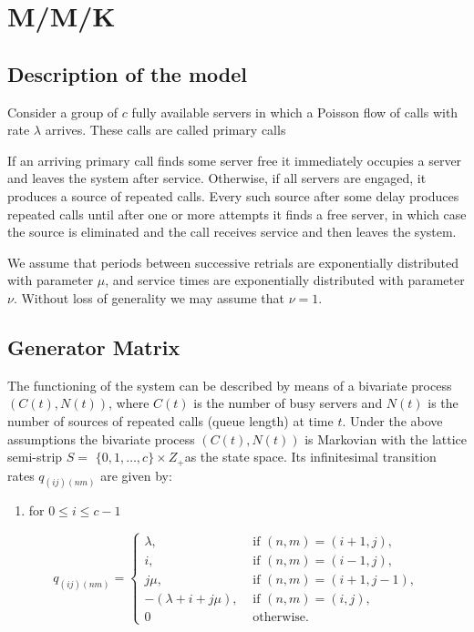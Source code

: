 \documentclass[10pt]{article}
\begin{document}
\section{M/M/K}
\subsection{Description of the model}
Consider a group of $c$ fully available servers in which a Poisson flow of calls with rate $\lambda$ arrives. These calls are called primary calls

If an arriving primary call finds some server free it immediately occupies a server and leaves the system after service. Otherwise, if all servers are engaged, it produces a source of repeated calls. Every such source after some delay produces repeated calls until after one or more attempts it finds a free server, in which case the source is eliminated and the call receives service and then leaves the system.

We assume that periods between successive retrials are exponentially distributed with parameter $\mu$, and service times are exponentially distributed with parameter $\nu$. Without loss of generality we may assume that $\nu=1$.
\subsection{Generator Matrix}
The functioning of the system can be described by means of a bivariate process $(C(t), N(t))$, where $C(t)$ is the number of busy servers and $N(t)$ is the number of sources of repeated calls (queue length) at time $t$. Under the above assumptions the bivariate process $(C(t), N(t))$ is Markovian with the lattice semi-strip $S=$ $\{0,1, \ldots, c\} \times Z_{+}$as the state space. Its infinitesimal transition rates $q_{(i j)(n m)}$ are given by:

\begin{enumerate}
  \item for $0 \leq i \leq c-1$
\end{enumerate}

$$
q_{(i j)(n m)}=\left\{\begin{array}{cl}
\lambda, & \text { if }(n, m)=(i+1, j), \\
i, & \text { if }(n, m)=(i-1, j), \\
j \mu, & \text { if }(n, m)=(i+1, j-1), \\
-(\lambda+i+j \mu), & \text { if }(n, m)=(i, j), \\
0 & \text { otherwise. }
\end{array}\right.
$$
\end{document}
